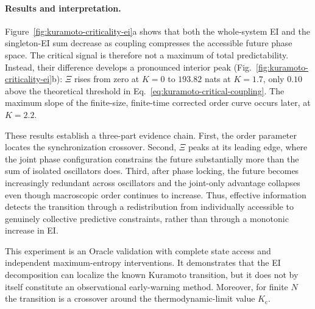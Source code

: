 \documentclass[fleqn,10pt]{wlscirep}
\begin{document}
\paragraph{Results and interpretation.}
Figure~\ref{fig:kuramoto-criticality-ei}a shows that both the whole-system EI and the singleton-EI sum decrease as coupling compresses the accessible future phase space. The critical signal is therefore not a maximum of total predictability. Instead, their difference develops a pronounced interior peak (Fig.~\ref{fig:kuramoto-criticality-ei}b): \(\Xi\) rises from zero at \(K=0\) to \(193.82\) nats at \(K=1.7\), only 
\(0.10\) above the theoretical threshold in Eq.~\eqref{eq:kuramoto-critical-coupling}. The maximum slope of the finite-size, finite-time corrected order curve occurs later, at \(K=2.2\). 

These results establish a three-part evidence chain. First, the order parameter locates the synchronization crossover. Second, \(\Xi\) peaks at its leading edge, where the joint phase configuration constrains the future substantially more than the sum of isolated oscillators does. Third, after phase locking, the future becomes increasingly redundant across oscillators and the joint-only advantage collapses even though macroscopic order continues to increase. Thus, effective information detects the transition through a redistribution from individually accessible to genuinely collective predictive constraints, rather than through a monotonic increase in EI.

This experiment is an Oracle validation with complete state access and independent maximum-entropy interventions. It demonstrates that the EI decomposition can localize the known Kuramoto transition, but it does not by itself constitute an observational early-warning method. Moreover, for finite \(N\) the transition is a crossover around the thermodynamic-limit value \(K_{\mathrm{c}}\).




\end{document}
